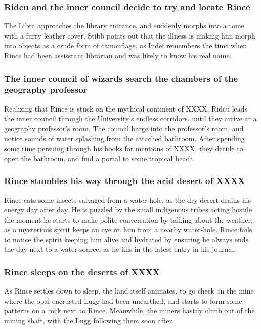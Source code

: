 \subsubsection{\Gls{Ridcu} and the inner council decide to try and locate \Gls{Rince}}
The \Gls{Libra} approaches the library entrance, and suddenly morphs into a tome with a furry
leather cover. \Gls{Stibb} points out that the illness is making him morph into objects as a crude
form of camouflage, as \Gls{Indef} remembers the time when \Gls{Rince} had been assisstant librarian
and was likely to know his real name.

\subsubsection{The inner council of wizards search the chambers of the geography professor}
Realizing that \Gls{Rince} is stuck on the mythical continent of XXXX, \Gls{Ridcu} leads the inner
council through the University's endless corridors, until they arrive at a geography professor's
room. The council barge into the professor's room, and notice sounds of water splashing from the
attached bathroom. After spending some time persuing through his books for mentions of XXXX, they
decide to open the bathroom, and find a portal to some tropical beach.

\subsubsection{\Gls{Rince} stumbles his way through the arid desert of XXXX}
\Gls{Rince} eats some insects salvaged from a water-hole, as the dry desert drains his energy day
after day. He is puzzled by the small indigenous tribes acting hostile the moment he starts to make
polite conversation by talking about the weather, as a mysterious spirit keeps an eye on him from a
nearby water-hole. \Gls{Rince} fails to notice the spirit keeping him alive and hydrated by ensuring
he always ends the day next to a water source, as he fills in the latest entry in his journal.

\subsubsection{\Gls{Rince} sleeps on the deserts of XXXX}
As \Gls{Rince} settles down to sleep, the land itself animates, to go check on the mine where the
opal encrusted \Gls{Lugg} had been unearthed, and starts to form some patterns on a rock next to
\Gls{Rince}. Meanwhile, the miners hastily climb out of the mining shaft, with the \Gls{Lugg}
following them soon after.

